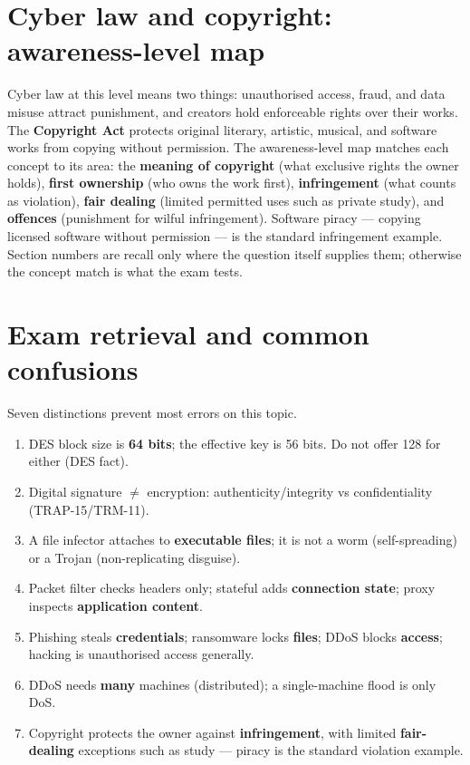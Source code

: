 \section{Cyber law and copyright: awareness-level map}
Cyber law at this level means two things: unauthorised access, fraud, and
data misuse attract punishment, and creators hold enforceable rights over
their works. The \textbf{Copyright Act} protects original literary, artistic,
musical, and software works from copying without permission. The
awareness-level map matches each concept to its area: the \textbf{meaning of
copyright} (what exclusive rights the owner holds), \textbf{first ownership}
(who owns the work first), \textbf{infringement} (what counts as violation),
\textbf{fair dealing} (limited permitted uses such as private study), and
\textbf{offences} (punishment for wilful infringement). Software piracy ---
copying licensed software without permission --- is the standard infringement
example. Section numbers are recall only where the question itself supplies
them; otherwise the concept match is what the exam tests.

\section{Exam retrieval and common confusions}
Seven distinctions prevent most errors on this topic.
\begin{enumerate}
  \item DES block size is \textbf{64 bits}; the effective key is 56 bits. Do
    not offer 128 for either (DES fact).
  \item Digital signature $\ne$ encryption: authenticity/integrity vs
    confidentiality (TRAP-15/TRM-11).
  \item A file infector attaches to \textbf{executable files}; it is not a
    worm (self-spreading) or a Trojan (non-replicating disguise).
  \item Packet filter checks headers only; stateful adds \textbf{connection
    state}; proxy inspects \textbf{application content}.
  \item Phishing steals \textbf{credentials}; ransomware locks \textbf{files};
    DDoS blocks \textbf{access}; hacking is unauthorised access generally.
  \item DDoS needs \textbf{many} machines (distributed); a single-machine
    flood is only DoS.
  \item Copyright protects the owner against \textbf{infringement}, with
    limited \textbf{fair-dealing} exceptions such as study --- piracy is the
    standard violation example.
\end{enumerate}

